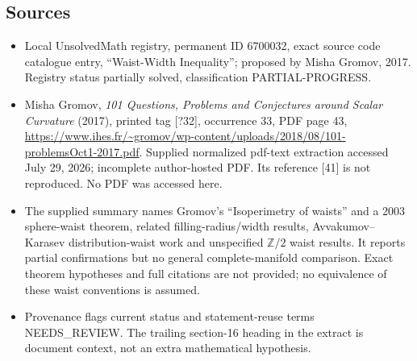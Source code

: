 \documentclass[11pt]{article}
\newcommand{\Z}{\mathbb{Z}}
\begin{document}
\subsection{Sources}
\begin{itemize}
\item Local UnsolvedMath registry, permanent ID 6700032, exact source code catalogue entry, ``Waist-Width Inequality''; proposed by Misha Gromov, 2017. Registry status partially solved, classification PARTIAL-PROGRESS.
\item Misha Gromov, \emph{101 Questions, Problems and Conjectures around Scalar Curvature} (2017), printed tag [?32], occurrence 33, PDF page 43, \url{https://www.ihes.fr/~gromov/wp-content/uploads/2018/08/101-problemsOct1-2017.pdf}. Supplied normalized pdf-text extraction accessed July 29, 2026; incomplete author-hosted PDF. Its reference [41] is not reproduced. No PDF was accessed here.
\item The supplied summary names Gromov's ``Isoperimetry of waists'' and a 2003 sphere-waist theorem, related filling-radius/width results, Avvakumov--Karasev distribution-waist work and unspecified $\Z/2$ waist results. It reports partial confirmations but no general complete-manifold comparison. Exact theorem hypotheses and full citations are not provided; no equivalence of these waist conventions is assumed.
\item Provenance flags current status and statement-reuse terms NEEDS\_REVIEW. The trailing section-16 heading in the extract is document context, not an extra mathematical hypothesis.
\end{itemize}
\end{document}
